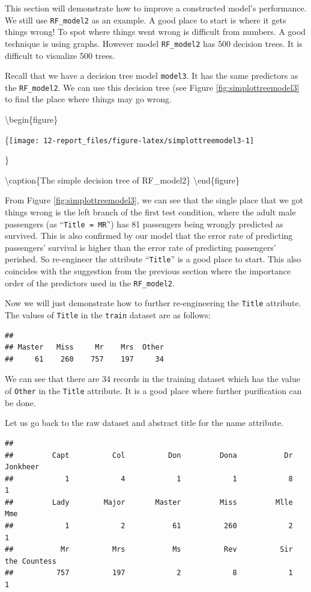 \documentclass[
]{book}
\begin{document}
This section will demonstrate how to improve a constructed model's performance. We still use \texttt{RF\_model2} as an example. A good place to start is where it gets things wrong! To spot where things went wrong is difficult from numbers. A good technique is using graphs. However model \texttt{RF\_model2} has 500 decision trees. It is difficult to visualize 500 trees.

Recall that we have a decision tree model \texttt{model3}. It has the same predictors as the \texttt{RF\_model2}. We can use this decision tree (see Figure \ref{fig:simplottreemodel3} to find the place where things may go wrong.

\textbackslash begin\{figure\}

\{\centering \texttt{[image: 12-report\_files/figure-latex/simplottreemodel3-1]}

\}

\textbackslash caption\{The simple decision tree of RF\_model2\}\label{fig:simplottreemodel3}
\textbackslash end\{figure\}

From Figure \ref{fig:simplottreemodel3}, we can see that the single place that we got things wrong is the left branch of the first test condition, where the adult male passengers (as ``\texttt{Title\ =\ MR}'') has 81 passengers being wrongly predicted as survived. This is also confirmed by our model that the error rate of predicting passengers' survival is higher than the error rate of predicting passengers' perished. So re-engineer the attribute ``\texttt{Title}'' is a good place to start. This also coincides with the suggestion from the previous section where the importance order of the predictors used in the \texttt{RF\_model2}.

Now we will just demonstrate how to further re-engineering the \texttt{Title} attribute. The values of \texttt{Title} in the \texttt{train} dataset are as follows:

\begin{verbatim}
## 
## Master   Miss     Mr    Mrs  Other 
##     61    260    757    197     34
\end{verbatim}

We can see that there are 34 records in the training dataset which has the value of \texttt{Other} in the \texttt{Title} attribute. It is a good place where further purification can be done.

Let us go back to the raw dataset and abstract title for the name attribute.

\begin{verbatim}
## 
##         Capt          Col          Don         Dona           Dr     Jonkheer 
##            1            4            1            1            8            1 
##         Lady        Major       Master         Miss         Mlle          Mme 
##            1            2           61          260            2            1 
##           Mr          Mrs           Ms          Rev          Sir the Countess 
##          757          197            2            8            1            1
\end{verbatim}
\end{document}
